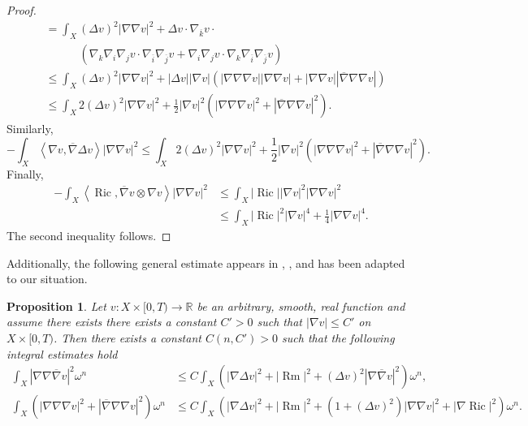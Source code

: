 \documentclass[12pt]{article}
\newtheorem{proposition}[theorem]{Proposition}
\numberwithin{equation}{section}
\newcommand{\R}{\mathbb{R}}
\DeclareMathOperator{\Ric}{Ric}
\DeclareMathOperator{\Rm}{Rm}
\newcommand{\oo}[1]{\overline{#1}}
\newcommand{\ip}[1]{\left\langle#1\right\rangle}
\begin{document}
\begin{proof}
{\begin{align*}
    &= \int_X (\Delta v)^2 |\nabla \nabla v|^2 + \Delta v \cdot \nabla_{\oo{k}} v \cdot\\
    &\quad\quad\quad (\nabla_k \nabla_i \nabla_j v \cdot \nabla_{\oo{i}} \nabla_{\oo{j}} v + \nabla_i \nabla_j v \cdot \nabla_k \nabla_{\oo{i}} \nabla_{\oo{j}} v)\\
    &\leq \int_X (\Delta v)^2 |\nabla \nabla v|^2 + |\Delta v| |\nabla v| (|\nabla \nabla \nabla v| |\nabla \nabla v|+|\nabla \nabla v||\oo{\nabla}\nabla \nabla v|)\\
    &\leq \int_X 2(\Delta v)^2 |\nabla \nabla v|^2 + \frac{1}{2}|\nabla v|^2 (|\nabla \nabla \nabla v|^2 + |\oo{\nabla} \nabla \nabla v|^2).
\end{align*}
}
Similarly,
\begin{equation*}
    -\int_X \ip{\nabla v, \oo{\nabla}\Delta v} |\nabla \nabla v|^2 \leq \int_X 2(\Delta v)^2 |\nabla \nabla v|^2 + \frac{1}{2}|\nabla v|^2 (|\nabla \nabla \nabla v|^2 + |\oo{\nabla} \nabla \nabla v|^2).
\end{equation*}
Finally,
\begin{align*}
    -\int_X \ip{\Ric, \oo{\nabla} v \otimes \nabla v} |\nabla \nabla v|^2 &\leq \int_X |\Ric| |\nabla v|^2 |\nabla \nabla v|^2\\
    &\leq \int_X |\Ric|^2 |\nabla v|^4 + \frac{1}{4}|\nabla \nabla v|^4.
\end{align*}
The second inequality follows.
\end{proof}

\noindent Additionally, the following general estimate appears in \cite[Lem. 4.4]{TZ16}, \cite[Lem. 3.5]{TZ15}, and has been adapted to our situation.

\begin{proposition}\label{triple_nabla_bounds}
Let $v: X \times [0,T) \to \R$ be an arbitrary, smooth, real function and assume there exists there exists a constant $C' >0 $ such that $|\nabla v| \leq C'$ on $X \times [0,T)$. Then there exists a constant $C(n, C') > 0$ such that the following integral estimates hold
\begin{align*}
    \int_X |\nabla \nabla \oo{\nabla} v|^2 \omega^n &\leq C\int_X (|\nabla \Delta v|^2 + |\Rm|^2 + (\Delta v)^2 |\nabla \oo{\nabla} v|^2 )\omega^n,\\
    \int_X (|\nabla \nabla \nabla v|^2 + |\oo{\nabla} \nabla \nabla v|^2) \omega^n &\leq C \int_X (|\nabla \Delta v|^2 + |\Rm|^2 + (1+(\Delta v)^2)|\nabla \nabla v|^2 + |\nabla \Ric|^2)\omega^n.
\end{align*}
\end{proposition}
\end{document}
